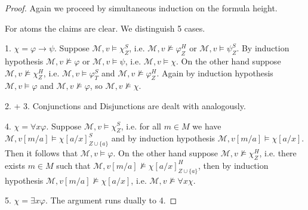 \documentclass[a4paper,UKenglish,cleveref, autoref, thm-restate]{lipics-v2021}
\begin{document}
\begin{proof}
	Again we proceed by simultaneous induction on the formula height.
	
	For atoms the claims are clear. We distinguish 5 cases.
	
	1. $\chi = \varphi\to\psi$. Suppose $\mathcal M, v\models\chi^S_Z$, i.e. $\mathcal M, v\not\models\varphi^H_Z$ or $\mathcal M, v\models\psi^S_Z$. By induction hypothesis $\mathcal M, v\not\models \varphi$ or $\mathcal M, v\models\psi$, i.e. $\mathcal M, v\models \chi$. On the other hand suppose $\mathcal M, v\not\models\chi^H_Z$, i.e. $\mathcal M, v\models\varphi^S_T$ and $\mathcal M, v\not\models\varphi^H_Z$. Again by induction hypothesis $\mathcal M,v\models\varphi$ and $\mathcal M, v\not\models \varphi$, so $\mathcal M, v\not\models\chi$.
	
	2. + 3. Conjunctions and Disjunctions are dealt with analogously.
	
	4. $\chi = \forall x\varphi$.  Suppose $\mathcal M, v\models\chi^S_Z$, i.e. for all $m\in M$ we have $\mathcal M, v[m/a]\models \chi[a/x]^S_{Z\cup\{a\}}$ and by induction hypothesis $\mathcal M, v[m/a]\models \chi[a/x]$. Then it follows that $\mathcal M, v\models\varphi$. On the other hand suppose $\mathcal M, v\not\models\chi^H_Z$, i.e. there exists $m\in M$ such that $\mathcal M, v[m/a]\not\models\chi[a/x]^H_{Z\cup \{a\}}$, then by induction hypothesis $\mathcal M, v[m/a]\not\models \chi[a/x]$, i.e. $\mathcal M, v\not\models\forall x\chi$.
	
	5. $\chi = \exists x\varphi$.  The argument runs dually to 4.
\end{proof}
\end{document}
